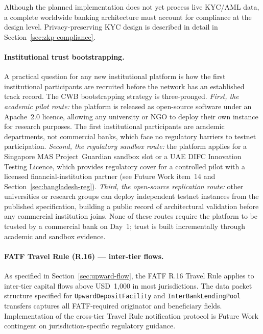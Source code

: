 \documentclass[12pt,a4paper]{report}
\begin{document}
Although the planned implementation does not yet process live KYC/AML data, a complete worldwide banking architecture must account for compliance at the design level. Privacy-preserving KYC design is described in detail in Section~\ref{sec:zkp-compliance}.

\paragraph{Institutional trust bootstrapping.}
A practical question for any new institutional platform is how the first institutional participants are recruited before the network has an established track record. The CWB bootstrapping strategy is three-pronged. \textit{First, the academic pilot route:} the platform is released as open-source software under an Apache~2.0 licence, allowing any university or NGO to deploy their own instance for research purposes. The first institutional participants are academic departments, not commercial banks, which face no regulatory barriers to testnet participation. \textit{Second, the regulatory sandbox route:} the platform applies for a Singapore MAS Project~Guardian sandbox slot or a UAE DIFC Innovation Testing Licence, which provides regulatory cover for a controlled pilot with a licensed financial-institution partner (see Future Work item~14 and Section~\ref{sec:bangladesh-reg}). \textit{Third, the open-source replication route:} other universities or research groups can deploy independent testnet instances from the published specification, building a public record of architectural validation before any commercial institution joins. None of these routes require the platform to be trusted by a commercial bank on Day~1; trust is built incrementally through academic and sandbox evidence.

\paragraph{FATF Travel Rule (R.16) --- inter-tier flows.}
As specified in Section~\ref{sec:upward-flow}, the FATF R.16 Travel Rule applies to inter-tier capital flows above USD~1,000 in most jurisdictions. The data packet structure specified for \texttt{UpwardDepositFacility} and \texttt{InterBankLendingPool} transfers captures all FATF-required originator and beneficiary fields. Implementation of the cross-tier Travel Rule notification protocol is Future Work contingent on jurisdiction-specific regulatory guidance.
\end{document}
